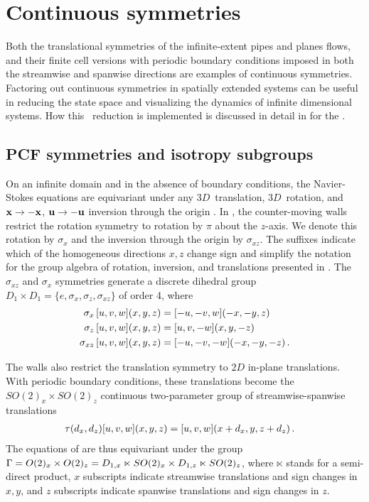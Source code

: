 \section{Continuous symmetries}

Both the translational symmetries of the infinite-extent
pipes and planes flows, and their finite cell versions with
periodic boundary conditions imposed in both the streamwise and
spanwise directions are examples of continuous symmetries.  Factoring
out continuous symmetries in spatially extended systems can be
useful in reducing the state space and visualizing the dynamics
of infinite dimensional systems.  How this \statesp\ reduction is
implemented is discussed in detail in
 for the \cLf.


\subsection{PCF symmetries and isotropy subgroups}
\label{s:symm}

On an infinite domain and in the absence of boundary conditions, the Navier-Stokes
equations are equivariant under any $3D$~translation, $3D$~rotation, and
${\bf x} \to -{\bf x}$, ${\bf u} \to -{\bf u}$ inversion through the origin .
In {\pCf}, the counter-moving walls restrict the rotation
symmetry to rotation by $\pi$ about the $z$-axis. We denote this rotation
by $\sigma_{x}$ and the inversion through the origin by $\sigma_{xz}$.
The suffixes indicate
which of the homogeneous directions $x,z$ change sign and simplify the
notation for the group algebra of rotation, inversion, and translations
presented in .
The $\sigma_{xz}$ and $\sigma_x$ symmetries generate a discrete dihedral group
$D_1 \times D_1 = \{e,\sigma_x,\sigma_{z},\sigma_{xz}\}$ of order 4, where
\begin{align}
\sigma_x    \, [u,v,w](x,y,z) &= [-u,-v,w](-x,-y,z) \nonumber \\
\sigma_z    \, [u,v,w](x,y,z) &= [u, v,-w](x,y,-z)  \label{sigma}\\
\sigma_{xz} \, [u,v,w](x,y,z) &= [-u,-v,-w](-x,-y,-z) \nonumber
\,.
\end{align}

The walls also restrict the translation symmetry to $2D$ in-plane
translations. With periodic boundary conditions, these translations
become the $SO(2)_x \times SO(2)_z$ continuous two-parameter
group of streamwise-spanwise translations
\begin{align}
\tau(d_x, d_z) [u, v, w](x,y,z) &= [u, v, w](x+d_x, y, z+ d_z)
\,.
\label{translation}
\end{align}
The equations of {\pCf} are thus equivariant under the group
$\Gamma = O(2)_x \times O(2)_z = D_{1,x} \ltimes SO(2)_{x} \times D_{1,z}
\ltimes SO(2)_z$, where $\ltimes$ stands for a semi-direct product,
$x$  subscripts indicate streamwise translations
and sign changes in $x,y$, and $z$ subscripts indicate spanwise translations
and sign changes in $z$.

